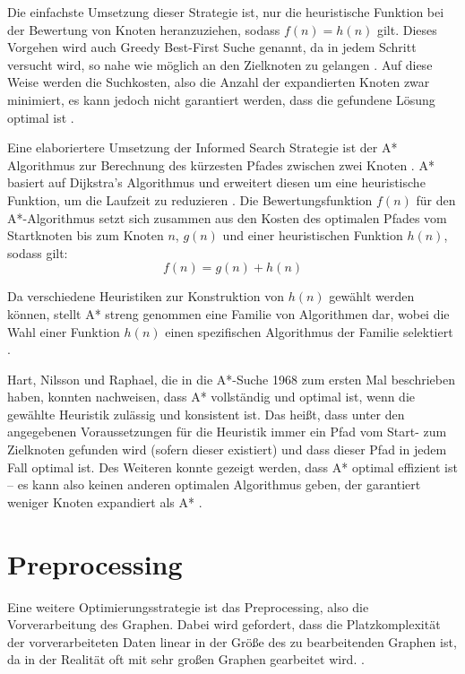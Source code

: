 Die einfachste Umsetzung dieser Strategie ist, nur die heuristische Funktion bei der Bewertung von Knoten heranzuziehen, sodass $f(n)=h(n)$ gilt. Dieses Vorgehen wird auch Greedy Best-First Suche genannt, da in jedem Schritt versucht wird, so nahe wie möglich an den Zielknoten zu gelangen \cite{Russel2010}. Auf diese Weise werden die Suchkosten, also die Anzahl der expandierten Knoten zwar minimiert, es kann jedoch nicht garantiert werden, dass die gefundene Lösung optimal ist \cite{Russel2010}.

Eine elaboriertere Umsetzung der Informed Search Strategie ist der A* Algorithmus zur Berechnung des kürzesten Pfades zwischen zwei Knoten \cite{Russel2010}. A* basiert auf Dijkstra’s Algorithmus und erweitert diesen um eine heuristische Funktion, um die Laufzeit zu reduzieren \cite{Peralta2020}. Die Bewertungsfunktion $f(n)$ für den A*-Algorithmus setzt sich zusammen aus den Kosten des optimalen Pfades vom Startknoten bis zum Knoten $n$, $g(n)$ und einer heuristischen Funktion $h(n)$, sodass gilt:
\begin{equation} \label{eq:3.1}
	f(n)=g(n)+h(n)
\end{equation}

Da verschiedene Heuristiken zur Konstruktion von $h(n)$ gewählt werden können, stellt A* streng genommen eine Familie von Algorithmen dar, wobei die Wahl einer Funktion $h(n)$ einen spezifischen Algorithmus der Familie selektiert \cite{Hart1968}. 

Hart, Nilsson und Raphael, die in \cite{Hart1968} die A*-Suche 1968 zum ersten Mal beschrieben haben, konnten nachweisen, dass A* vollständig und optimal ist, wenn die gewählte Heuristik zulässig und konsistent ist. Das heißt, dass unter den angegebenen Voraussetzungen für die Heuristik immer ein Pfad vom Start- zum Zielknoten gefunden wird (sofern dieser existiert) und dass dieser Pfad in jedem Fall optimal ist. Des Weiteren konnte gezeigt werden, dass A* optimal effizient ist – es kann also keinen anderen optimalen Algorithmus geben, der garantiert weniger Knoten expandiert als A* \cite{Russel2010}.

\section{Preprocessing}
Eine weitere Optimierungsstrategie ist das Preprocessing, also die Vorverarbeitung des Graphen. Dabei wird gefordert, dass die Platzkomplexität der vorverarbeiteten Daten linear in der Größe des zu bearbeitenden Graphen ist, da in der Realität oft mit sehr großen Graphen gearbeitet wird. \cite{Goldberg2005}. 

